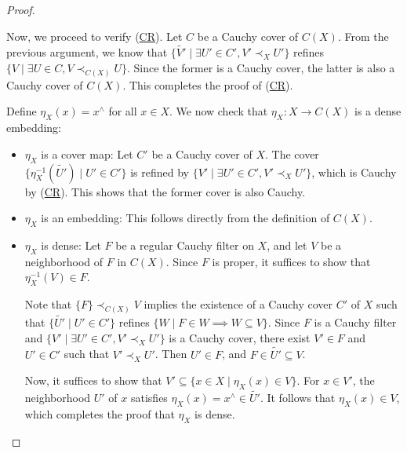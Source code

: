 \documentclass[pdflatex,sn-mathphys-num]{sn-jnl}
\newcommand{\axref}[1]{(\hyperref[ax:#1]{#1})}
\theoremstyle{definition}
\theoremstyle{remark}
\numberwithin{figure}{section}
\newcommand{\rb}{\prec}
\begin{document}
\begin{proof}
\begin{itemize}
        Now, we proceed to verify \axref{CR}.
        Let $C$ be a Cauchy cover of $C(X)$.
        From the previous argument, we know that $\{ \widetilde{V'} \mid \exists U' \in C', V' \rb_X U' \}$ refines $\{ V \mid \exists U \in C, V \rb_{C(X)} U \}$.
        Since the former is a Cauchy cover, the latter is also a Cauchy cover of $C(X)$.
        This completes the proof of \axref{CR}.
\end{itemize}

Define $\eta_X(x) = x^\wedge$ for all $x \in X$.
We now check that $\eta_X : X \to C(X)$ is a dense embedding:
\begin{itemize}
\item $\eta_X$ is a cover map: Let $C'$ be a Cauchy cover of $X$.
The cover $\{ \eta_X^{-1}(\widetilde{U'}) \mid U' \in C' \}$ is refined by $\{ V' \mid \exists U' \in C', V' \rb_X U' \}$, which is Cauchy by \axref{CR}.
This shows that the former cover is also Cauchy.
\item $\eta_X$ is an embedding: This follows directly from the definition of $C(X)$.
\item $\eta_X$ is dense:
        Let $F$ be a regular Cauchy filter on $X$, and let $V$ be a neighborhood of $F$ in $C(X)$.
        Since $F$ is proper, it suffices to show that $\eta_X^{-1}(V) \in F$.

        Note that $\{ F \} \rb_{C(X)} V$ implies the existence of a Cauchy cover $C'$ of $X$ such that $\{ \widetilde{U'} \mid U' \in C' \}$ refines $\{ W \mid F \in W \implies W \subseteq V \}$.
        Since $F$ is a Cauchy filter and $\{ V' \mid \exists U' \in C', V' \rb_X U' \}$ is a Cauchy cover, there exist $V' \in F$ and $U' \in C'$ such that $V' \rb_X U'$.
        Then $U' \in F$, and $F \in \widetilde{U'} \subseteq V$.

        Now, it suffices to show that $V' \subseteq \{ x \in X \mid \eta_X(x) \in V \}$.
        For $x \in V'$, the neighborhood $U'$ of $x$ satisfies $\eta_X(x) = x^\wedge \in \widetilde{U'}$.
        It follows that $\eta_X(x) \in V$, which completes the proof that $\eta_X$ is dense.
\end{itemize}


\end{proof}
\end{document}
